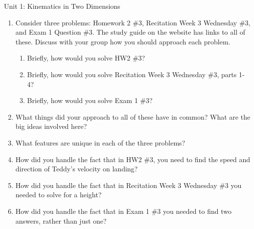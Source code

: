\documentclass[12pt]{article}
\begin{document}
\begin{center}
	\Large Unit 1: Kinematics in Two Dimensions
\end{center}
\begin{enumerate}
	\item Consider three problems: Homework 2 \#3, Recitation Week 3 Wednesday \#3, and Exam 1 Question \#3. The study guide on the website has links to all of these. Discuss with your group how you should approach each problem.
	
	\begin{enumerate}
		\item Briefly, how would you solve HW2 \#3? 
		\vspace{1in}
		\item Briefly, how would you solve Recitation Week 3 Wednesday \#3, parts 1-4?
		\vspace{1in}
		\item Briefly, how would you solve Exam 1 \#3?
		\vspace{1in}
	\end{enumerate}
\item What things did your approach to all of these have in common? What are the big ideas involved here?

\newpage

\item What features are unique in each of the three problems?

\vspace{3in}

\item How did you handle the fact that in HW2 \#3, you need to find the speed and direction of Teddy's velocity on landing?

\vspace{1.5in}

\item How did you handle the fact that in Recitation Week 3 Wednesday \#3 you needed to solve for a height?

\vspace{1.5in}

\item How did you handle the fact that in Exam 1 \#3 you needed to find two answers, rather than just one?
\end{enumerate}




 
\end{document}
